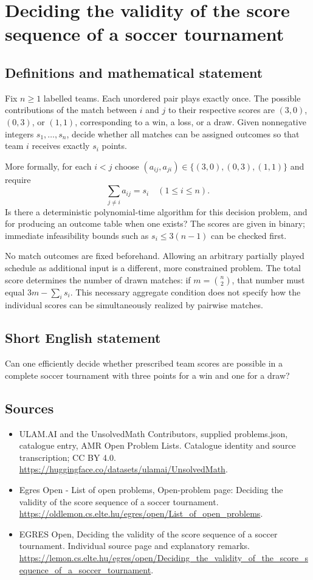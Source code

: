 \documentclass[11pt,a4paper]{article}
\begin{document}
\section*{Deciding the validity of the score sequence of a soccer tournament}\label{statement}

\subsection{Definitions and mathematical statement}
Fix $n\ge1$ labelled teams. Each unordered pair plays exactly once.
The possible contributions of the match between $i$ and $j$ to their
respective scores are $(3,0)$, $(0,3)$, or $(1,1)$, corresponding to
a win, a loss, or a draw. Given nonnegative integers $s_1,\ldots,s_n$,
decide whether all matches can be assigned outcomes so that team $i$
receives exactly $s_i$ points.

More formally, for each $i<j$ choose
$(a_{ij},a_{ji})\in\{(3,0),(0,3),(1,1)\}$ and require
\[
                             \sum_{j\ne i}a_{ij}=s_i
                                  \quad(1\le i\le n).
\]
Is there a deterministic polynomial-time algorithm for this decision
problem, and for producing an outcome table when one exists?
The scores are given in binary; immediate infeasibility bounds such as
$s_i\le3(n-1)$ can be checked first.

No match outcomes are fixed beforehand. Allowing an arbitrary partially
played schedule as additional input is a different, more constrained
problem. The total score determines the number of drawn matches:
if $m=\binom n2$, that number must equal $3m-\sum_i s_i$.
This necessary aggregate condition does not specify how the individual
scores can be simultaneously realized by pairwise matches.
\subsection{Short English statement}
Can one efficiently decide whether prescribed team scores are
possible in a complete soccer tournament with three points for a win and one for a draw?
\subsection{Sources}
\begin{itemize}
\item[S1] ULAM.AI and the UnsolvedMath Contributors, supplied problems.json, catalogue entry, AMR Open Problem Lists. Catalogue identity and source transcription; CC BY 4.0.
\url{https://huggingface.co/datasets/ulamai/UnsolvedMath}.
\item[S2] Egres Open - List of open problems, Open-problem page: Deciding the validity of the score sequence of a soccer tournament. 
\url{https://oldlemon.cs.elte.hu/egres/open/List_of_open_problems}.
\item[S3] EGRES Open, Deciding the validity of the score sequence of a soccer tournament. Individual source page and explanatory remarks.
\url{https://lemon.cs.elte.hu/egres/open/Deciding_the_validity_of_the_score_sequence_of_a_soccer_tournament}.
\end{itemize}
\end{document}
